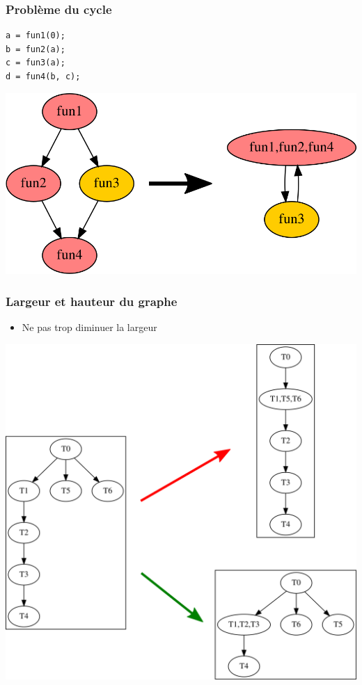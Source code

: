 \documentclass{beamer}
\begin{document}
\begin{frame}[fragile]
  \frametitle{Problème du cycle}

\begin{lstlisting}
a = fun1(0);
b = fun2(a);
c = fun3(a);
d = fun4(b, c);
\end{lstlisting}

  \centerline{\includegraphics[width=0.8\linewidth]{agg_invalid}}
\end{frame}


\begin{frame}
  \frametitle{Largeur et hauteur du graphe}

  \begin{itemize}
    \item Ne pas trop diminuer la largeur
  \end{itemize}

  \centerline{\includegraphics[width=0.6\linewidth]{agg_hl}}
\end{frame}
\end{document}
